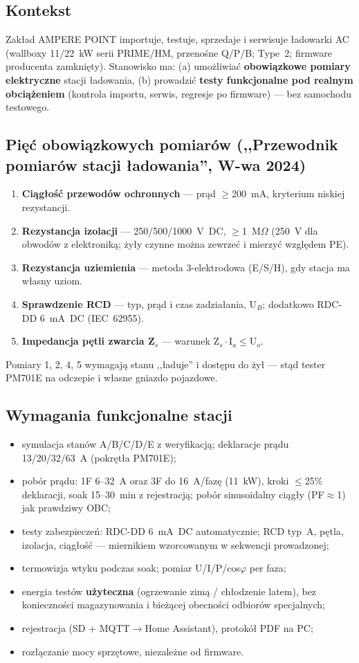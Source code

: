 \documentclass[11pt,a4paper]{article}
\newcommand{\ohm}{$\Omega$}
\begin{document}
\subsection{Kontekst}
Zakład AMPERE POINT importuje, testuje, sprzedaje i serwisuje ładowarki AC (wallboxy 11/22~kW
serii PRIME/HM, przenośne Q/P/B; Type~2; firmware producenta zamknięty). Stanowisko ma:
(a) umożliwiać \textbf{obowiązkowe pomiary elektryczne} stacji ładowania, (b) prowadzić
\textbf{testy funkcjonalne pod realnym obciążeniem} (kontrola importu, serwis, regresje po
firmware) --- bez samochodu testowego.
\subsection{Pięć obowiązkowych pomiarów (,,Przewodnik pomiarów stacji ładowania'', W-wa 2024)}
\begin{enumerate}
\item \textbf{Ciągłość przewodów ochronnych} --- prąd $\ge$200~mA, kryterium niskiej rezystancji.
\item \textbf{Rezystancja izolacji} --- 250/500/1000~V~DC, $\ge$1~M\ohm{} (250~V dla obwodów
z elektroniką; żyły czynne można zewrzeć i mierzyć względem PE).
\item \textbf{Rezystancja uziemienia} --- metoda 3-elektrodowa (E/S/H), gdy stacja ma własny uziom.
\item \textbf{Sprawdzenie RCD} --- typ, prąd i czas zadziałania, U$_B$; dodatkowo RDC-DD 6~mA~DC
(IEC~62955).
\item \textbf{Impedancja pętli zwarcia Z$_s$} --- warunek Z$_s\cdot$I$_a\le$U$_o$.
\end{enumerate}
Pomiary 1, 2, 4, 5 wymagają stanu ,,ładuje'' i dostępu do żył --- stąd tester PM701E na odczepie
i własne gniazdo pojazdowe.
\subsection{Wymagania funkcjonalne stacji}
\begin{itemize}
\item symulacja stanów A/B/C/D/E z weryfikacją; deklaracje prądu 13/20/32/63~A (pokrętła PM701E);
\item pobór prądu: 1F 6--32~A oraz 3F do 16~A/fazę (11~kW), kroki $\le$25\% deklaracji, soak
15--30~min z rejestracją; pobór sinusoidalny ciągły (PF$\approx$1) jak prawdziwy OBC;
\item testy zabezpieczeń: RDC-DD 6~mA~DC automatycznie; RCD typ~A, pętla, izolacja, ciągłość ---
miernikiem wzorcowanym w sekwencji prowadzonej;
\item termowizja wtyku podczas soak; pomiar U/I/P/cos$\varphi$ per faza;
\item energia testów \textbf{użyteczna} (ogrzewanie zimą / chłodzenie latem), bez konieczności
magazynowania i bieżącej obecności odbiorów specjalnych;
\item rejestracja (SD + MQTT$\to$Home Assistant), protokół PDF na PC;
\item rozłączanie mocy sprzętowe, niezależne od firmware.
\end{itemize}
\end{document}
